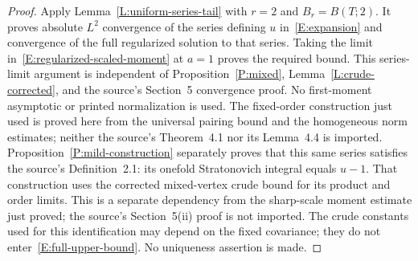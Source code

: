 \documentclass[12pt,oneside,openany]{book}
\numberwithin{equation}{section}
\theoremstyle{nogostyle}
\theoremstyle{definition}
\begin{document}
\begin{proof}
  Apply Lemma~\ref{L:uniform-series-tail} with $r = 2$ and $B_r = B(T;2)$. It
  proves absolute $L^2$ convergence of the series defining $u$
  in~\eqref{E:expansion} and convergence of the full regularized solution to
  that series. Taking the limit in~\eqref{E:regularized-scaled-moment} at $a =
  1$ proves the required bound. This series-limit argument is independent of
  Proposition~\ref{P:mixed}, Lemma~\ref{L:crude-corrected}, and the source's
  Section~5 convergence proof. No first-moment asymptotic or printed
  normalization is used. The fixed-order construction just used is proved here
  from the universal pairing bound and the homogeneous norm estimates; neither
  the source's Theorem~4.1 nor its Lemma~4.4 is imported.
  Proposition~\ref{P:mild-construction} separately proves that this same series
  satisfies the source's Definition~2.1: its onefold Stratonovich integral
  equals $u-1$. That construction uses the corrected mixed-vertex crude bound
  for its product and order limits. This is a separate dependency from the
  sharp-scale moment estimate just proved; the source's Section~5(ii) proof is
  not imported. The crude constants used for this identification may depend on
  the fixed covariance; they do not enter~\eqref{E:full-upper-bound}. No
  uniqueness assertion is made.




\end{proof}
\end{document}
